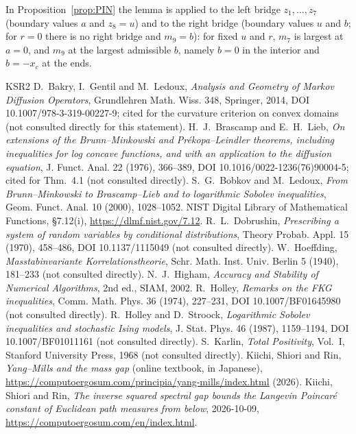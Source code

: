 \documentclass[11pt,a4paper]{article}
\theoremstyle{definition}
\theoremstyle{remark}
\newcommand{\xc}{x_c}
\begin{document}
In Proposition~\ref{prop:PIN} the lemma is applied to the left bridge $z_1,\dots,z_7$ (boundary values $a$ and $z_8=u$) and to the right bridge (boundary values $u$ and $b$; for $r=0$ there is no right bridge and $m_9=b$): for fixed $u$ and $r$, $m_7$ is largest at $a=0$, and $m_9$ at the largest admissible $b$, namely $b=0$ in the interior and $b=-\xc$ at the ends.
\begin{thebibliography}{KSR2}
 D.~Bakry, I.~Gentil and M.~Ledoux, \emph{Analysis and Geometry of Markov Diffusion Operators}, Grundlehren Math. Wiss. 348, Springer, 2014, DOI 10.1007/978-3-319-00227-9; cited for the curvature criterion on convex domains (not consulted directly for this statement).
 H.~J.~Brascamp and E.~H.~Lieb, \emph{On extensions of the Brunn--Minkowski and Pr\'ekopa--Leindler theorems, including inequalities for log concave functions, and with an application to the diffusion equation}, J. Funct. Anal. 22 (1976), 366--389, DOI 10.1016/0022-1236(76)90004-5; cited for Thm.~4.1 (not consulted directly).
 S.~G.~Bobkov and M.~Ledoux, \emph{From Brunn--Minkowski to Brascamp--Lieb and to logarithmic Sobolev inequalities}, Geom. Funct. Anal. 10 (2000), 1028--1052.
 NIST Digital Library of Mathematical Functions, \S7.12(i), \url{https://dlmf.nist.gov/7.12}.
 R.~L.~Dobrushin, \emph{Prescribing a system of random variables by conditional distributions}, Theory Probab. Appl. 15 (1970), 458--486, DOI 10.1137/1115049 (not consulted directly).
 W.~Hoeffding, \emph{Masstabinvariante Korrelationstheorie}, Schr. Math. Inst. Univ. Berlin 5 (1940), 181--233 (not consulted directly).
 N.~J.~Higham, \emph{Accuracy and Stability of Numerical Algorithms}, 2nd ed., SIAM, 2002.
 R.~Holley, \emph{Remarks on the FKG inequalities}, Comm. Math. Phys. 36 (1974), 227--231, DOI 10.1007/BF01645980 (not consulted directly).
 R.~Holley and D.~Stroock, \emph{Logarithmic Sobolev inequalities and stochastic Ising models}, J. Stat. Phys. 46 (1987), 1159--1194, DOI 10.1007/BF01011161 (not consulted directly).
 S.~Karlin, \emph{Total Positivity}, Vol.~I, Stanford University Press, 1968 (not consulted directly).
 Kiichi, Shiori and Rin, \emph{Yang--Mills and the mass gap} (online textbook, in Japanese), \url{https://computoergosum.com/principia/yang-mills/index.html} (2026).
 Kiichi, Shiori and Rin, \emph{The inverse squared spectral gap bounds the Langevin Poincar\'e constant of Euclidean path measures from below}, 2026-10-09, \url{https://computoergosum.com/en/index.html}.

\end{thebibliography}
\end{document}
